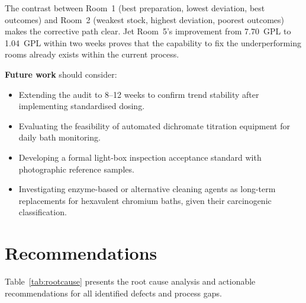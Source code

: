 \documentclass{book}
\begin{document}
The contrast between Room~1 (best preparation, lowest deviation, best outcomes) and Room~2 (weakest stock, highest deviation, poorest outcomes) makes the corrective path clear. Jet Room~5's improvement from 7.70~GPL to 1.04~GPL within two weeks proves that the capability to fix the underperforming rooms already exists within the current process.

\textbf{Future work} should consider:
\begin{itemize}[leftmargin=1.5em]
  \item Extending the audit to 8--12 weeks to confirm trend stability after implementing standardised dosing.
  \item Evaluating the feasibility of automated dichromate titration equipment for daily bath monitoring.
  \item Developing a formal light-box inspection acceptance standard with photographic reference samples.
  \item Investigating enzyme-based or alternative cleaning agents as long-term replacements for hexavalent chromium baths, given their carcinogenic classification.
\end{itemize}

\chapter{Recommendations}

Table~\ref{tab:rootcause} presents the root cause analysis and actionable recommendations for all identified defects and process gaps.
\end{document}
